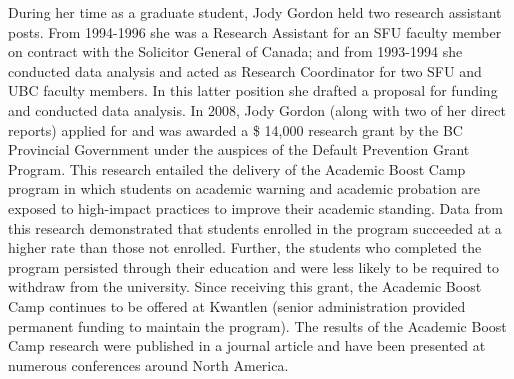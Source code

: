 \documentclass[letterpaper,10pt,headsepline]{scrreprt}
\begin{document}
During her time as a graduate student, Jody Gordon held two research assistant
posts. From 1994-1996 she was a Research Assistant for an SFU faculty member
on contract with the Solicitor General of Canada; and from 1993-1994 she
conducted data analysis and acted as Research Coordinator for two SFU and UBC
faculty members. In this latter position she drafted a proposal for funding
and conducted data analysis. In 2008, Jody Gordon (along with two of her
direct reports) applied for and was awarded a \$ 14,000 research grant by the
BC Provincial Government under the auspices of the Default Prevention Grant
Program. This research entailed the delivery of the Academic Boost Camp
program in which students on academic warning and academic probation are
exposed to high-impact practices to improve their academic standing. Data from
this research demonstrated that students enrolled in the program succeeded at
a higher rate than those not enrolled. Further, the students who completed the
program persisted through their education and were less likely to be required
to withdraw from the university. Since receiving this grant, the Academic
Boost Camp continues to be offered at Kwantlen (senior administration provided
permanent funding to maintain the program). The results of the Academic Boost
Camp research were published in a journal article and have been presented at
numerous conferences around North America.
\end{document}
